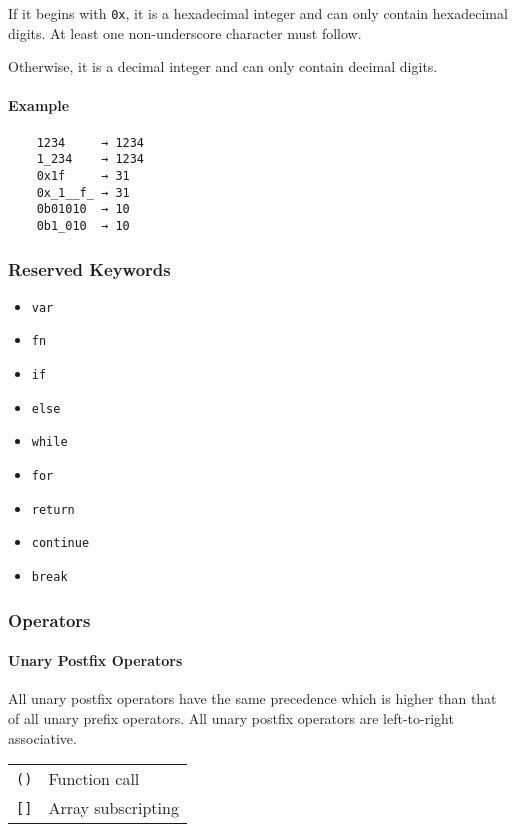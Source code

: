 If it begins with \verb|0x|, it is a hexadecimal integer and can only contain hexadecimal digits. At least one non-underscore character must follow.

Otherwise, it is a decimal integer and can only contain decimal digits.

\paragraph{Example}

\begin{verbatim}
    1234     → 1234
    1_234    → 1234
    0x1f     → 31
    0x_1__f_ → 31
    0b01010  → 10
    0b1_010  → 10
\end{verbatim}

\subsubsection{Reserved Keywords}

\begin{itemize}
    \item \verb|var|
    \item \verb|fn|
    \item \verb|if|
    \item \verb|else|
    \item \verb|while|
    \item \verb|for|
    \item \verb|return|
    \item \verb|continue|
    \item \verb|break|
\end{itemize}

\subsubsection{Operators}

\paragraph{Unary Postfix Operators}

All unary postfix operators have the same precedence which is higher than that of all unary prefix operators. All unary postfix operators are left-to-right associative.

\begin{table}[H]
    \begin{tabular}{ l l }
        \verb|()| & Function call      \\
        \verb|[]| & Array subscripting \\
    \end{tabular}
\end{table}

